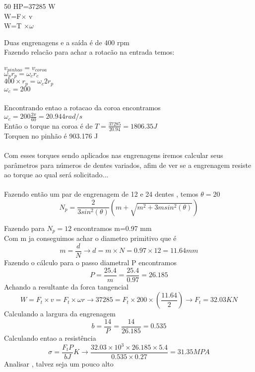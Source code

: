 \documentclass[11pt,a4paper]{article}
\begin{document}
50 HP=37285 W\\
W=F$\times $ v\\
W=T $\times \omega $

Duas engrenagens e a saída é de 400 rpm\\
Fazendo relacão para achar a rotacão na entrada temos:\\\\
$v_{pinhao}=v_{coroa}$\\
$\omega_p r_p =\omega_c r_c$\\
$400 \times r_p= \omega_c 2r_p$\\
$\omega_c=200$\\\\
Encontrando entao a rotacao da coroa encontramos\\
$\omega_c=200 \frac{2\pi}{60}=20.944 rad/s$\\
Então o torque na coroa é de 
$T=\frac{37285}{20.94}=1806.35 J$\\
Torquen no pinhão é 903.176 J\\\\
Com esses torques sendo aplicados nas engrenagens iremos calcular seus parâmetros para números de dentes variados, afim de ver se a engrenagem resiste ao torque ao qual será solicitado...\\\\

Fazendo então um par de engrenagem de 12 e 24 dentes , temos
$\theta = 20$
$$N_p=\frac{2}{3sin^2(\theta)} \left( m +\sqrt{m^2+3msin^2(\theta)}\right)$$

Fazendo para $N_p=12$ encontramos m=0.97 mm\\
Com m ja conseguimos achar o diametro primitivo que é 
$$m=\frac{d}{N} \rightarrow d=m \times N =0.97 \times 12=11.64 mm$$
Fazendo o cálculo para o passo diametral P encontramos 
$$P=\frac{25.4}{m}=\frac{25.4}{0.97}=26.185$$
Achando a resultante da forca tangencial
$$W=F_t \times v=F_t \times \omega r\rightarrow 37285=F_t \times 200\times \left( \frac{11.64}{2} \right)\rightarrow F_t=32.03 KN$$
Calculando a largura da engrenagem
$$b=\frac{14}{P}=\frac{14}{26.185}=0.535$$
Calculando entao a resistência 
$$\sigma =\frac{F_tP}{bJ}K\rightarrow \frac{32.03 \times 10^3 \times 26.185 \times 5.4}{0.535 \times 0.27}=31.35 MPA$$
Analisar , talvez seja um pouco alto
\end{document}
